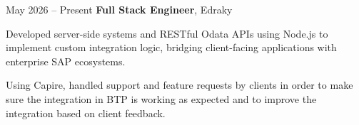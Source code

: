 \begin{twocolentry}{
            May 2026 – Present
        }
\textbf{Full Stack Engineer}, Edraky\end{twocolentry}

\vspace{0.10 cm}
\begin{onecolentry}
    \begin{highlights}
        \item Developed server-side systems and RESTful Odata APIs using Node.js to implement custom integration logic, bridging client-facing applications with enterprise SAP ecosystems.
        \item Using Capire, handled support and feature requests by clients in order to make sure the integration in BTP is working as expected and to improve the integration based on client feedback.
    \end{highlights}
\end{onecolentry}